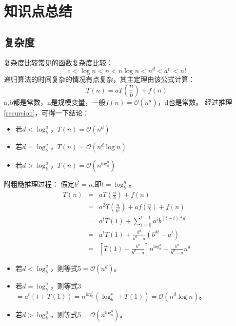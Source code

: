 \section{知识点总结}
\subsection{复杂度}
复杂度比较常见的函数复杂度比较：
\begin{equation}
c < \log n < n < n\log n < n^d < a^n < n!	\nonumber
\end{equation}
递归算法的时间复杂的情况有点复杂，其主定理由该公式计算：
\begin{equation}
T(n) = aT(\frac{n}{b}) + f(n)  	\nonumber
\end{equation}
a,b都是常数，n是规模变量，一般$f(n)=\mathcal{O}(n^d)$，d也是常数。
经过推理\ref{recursion}，可得一下结论：
\begin{itemize}
\item 若$d < \log_b^a$，$T(n)=\mathcal{O}(n^d)$
\item 若$d = \log_b^a$，$T(n)=\mathcal{O}(n^d\log n)$
\item 若$d > \log_b^a$，$T(n)=\mathcal{O}(n^{\log_b^a})$
\end{itemize}
附粗糙推理过程：
假定$b^t=n$,即$t=\log_b^n$。
\begin{eqnarray}
\label{recursion}
T(n) &=& aT(\frac{n}{b}) + f(n)  	\\
&=& a^2T(\frac{n}{b^2}) + af(\frac{n}{b}) + f(n) \\
&=& a^tT(1) + \sum_{i=0}^{t-1} a^i b^{(t-i)*d} \\
&=& a^tT(1) + \frac{b^d}{b^d-a}(b^{dt}-a^t) \\
&=& [T(1)-\frac{b^d}{b^d-a}] n^{\log_b^a} + \frac{b^d}{b^d-a}n^d
\end{eqnarray}
\begin{itemize}
\item 若$d < \log_b^a$，则等式5$=\mathcal{O}(n^d)$。
\item 若$d = \log_b^a$，则等式3$=a^t(t+T(1))=n^{\log_b^a}(\log_b^n+T(1))=\mathcal{O}(n^d\log n)$。
\item 若$d > \log_b^a$，则等式5$=\mathcal{O}(n^{\log_b^a})$。
\end{itemize}




